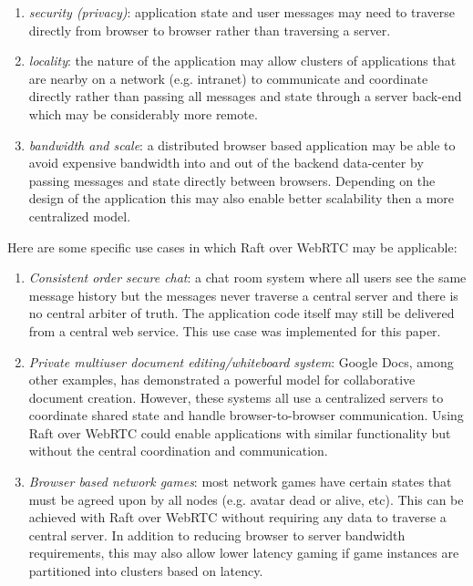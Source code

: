 \documentclass[conference,compsoc]{./IEEEtran/IEEEtran}
\begin{document}
\begin{enumerate}
\item \emph{security (privacy)}: application state and user messages
    may need to traverse directly from browser to browser rather than
    traversing a server.
\item \emph{locality}: the nature of the application may allow
    clusters of applications that are nearby on a network (e.g.
    intranet) to communicate and coordinate directly rather than
    passing all messages and state through a server back-end which may
    be considerably more remote.
\item \emph{bandwidth and scale}: a distributed browser based
    application may be able to avoid expensive bandwidth into and out
    of the backend data-center by passing messages and state directly
    between browsers.  Depending on the design of the application this
    may also enable better scalability then a more centralized model.
\end{enumerate}

Here are some specific use cases in which Raft over WebRTC may be
applicable:

\begin{enumerate}
\item \emph{Consistent order secure chat}: a chat room system where
    all users see the same message history but the messages never
    traverse a central server and there is no central arbiter
    of truth. The application code itself may still be delivered from
    a central web service. This use case was implemented
    for this paper.
\item \emph{Private multiuser document editing/whiteboard system}:
    Google Docs, among other examples, has demonstrated a powerful
    model for collaborative document creation. However, these systems
    all use a centralized servers to coordinate shared state and
    handle browser-to-browser communication. %
    Using Raft over WebRTC could enable applications with similar
    functionality but without the central coordination and
    communication.
\item \emph{Browser based network games}: most network games have
    certain states that must be agreed upon by all nodes (e.g. avatar
    dead or alive, etc). This can be achieved with Raft over WebRTC
    without requiring any data to traverse a central server. In
    addition to reducing browser to server bandwidth requirements,
    this may also allow lower latency gaming if game instances are
    partitioned into clusters based on latency.
\end{enumerate}
\end{document}
